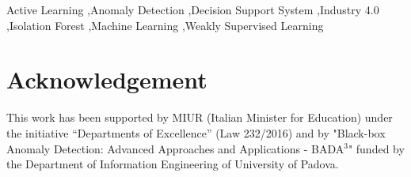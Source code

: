\documentclass[preprint,10pt,a4paper]{elsarticle}
\newcommand{\tommi}[1]{\textcolor{blue}{#1}}
\begin{document}
\begin{keyword}
Active Learning \sep Anomaly Detection \sep Decision Support System \sep Industry 4.0 \sep Isolation Forest \sep Machine Learning \sep Weakly Supervised Learning
\end{keyword}
\maketitle










\section*{Acknowledgement}
This work has been supported by MIUR (Italian Minister for Education) under the initiative “Departments of Excellence” (Law 232/2016) and by "Black-box Anomaly Detection: Advanced Approaches and Applications - BADA$^3$" funded by the Department of Information Engineering of University of Padova.


\end{document}
